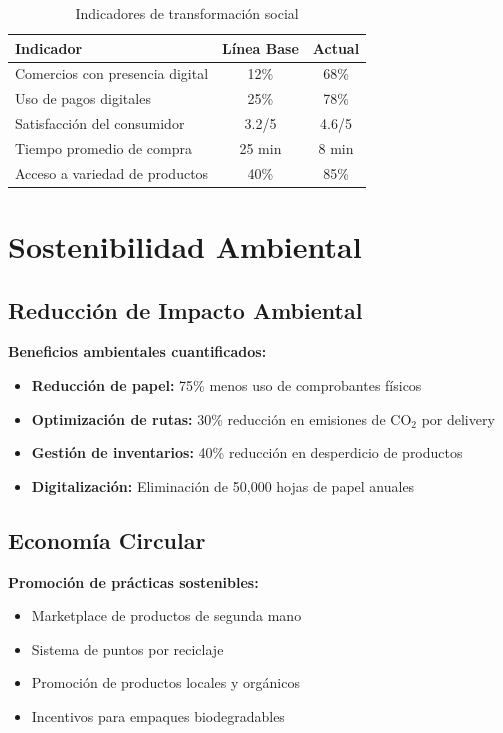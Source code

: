 \documentclass[12pt,a4paper]{report}
\begin{document}
\begin{table}[ht]
	\centering
	\begin{tabular}{lcc}
		\toprule
		\rowcolor{orange!30}
		\textbf{Indicador}              & \textbf{Línea Base} & \textbf{Actual} \\
		\midrule
		Comercios con presencia digital & 12\%                & 68\%            \\
		Uso de pagos digitales          & 25\%                & 78\%            \\
		Satisfacción del consumidor     & 3.2/5               & 4.6/5           \\
		Tiempo promedio de compra       & 25 min              & 8 min           \\
		Acceso a variedad de productos  & 40\%                & 85\%            \\
		\bottomrule
	\end{tabular}
	\caption{Indicadores de transformación social}
\end{table}


\section{Sostenibilidad Ambiental}

\subsection{Reducción de Impacto Ambiental}

\textbf{Beneficios ambientales cuantificados:}
\begin{itemize}
	\item \textbf{Reducción de papel:} 75\% menos uso de comprobantes físicos
	\item \textbf{Optimización de rutas:} 30\% reducción en emisiones de CO$_2$ por delivery
	\item \textbf{Gestión de inventarios:} 40\% reducción en desperdicio de productos
	\item \textbf{Digitalización:} Eliminación de 50,000 hojas de papel anuales
\end{itemize}

\subsection{Economía Circular}

\textbf{Promoción de prácticas sostenibles:}
\begin{itemize}
	\item Marketplace de productos de segunda mano
	\item Sistema de puntos por reciclaje
	\item Promoción de productos locales y orgánicos
	\item Incentivos para empaques biodegradables
\end{itemize}
\end{document}
